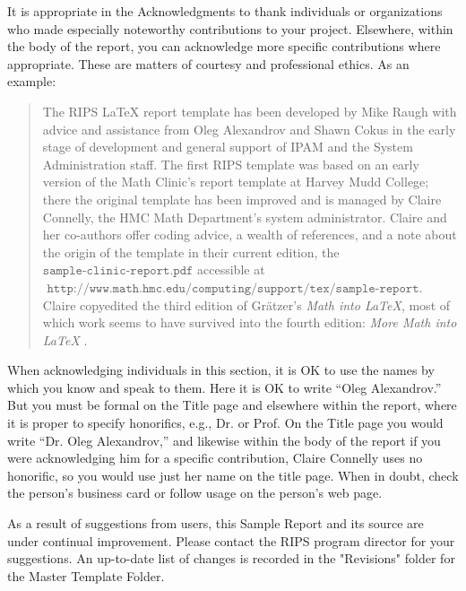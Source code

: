It is appropriate in the Acknowledgments to thank individuals or organizations who made especially noteworthy contributions to your project.
Elsewhere, within the body of the report, you can acknowledge more specific contributions where appropriate.
These are matters of courtesy and professional ethics.
As an example:

\begin{quote}
The RIPS {\LaTeX} report template has been developed by Mike Raugh with advice and assistance from Oleg 
Alexandrov and Shawn Cokus in the early stage of development and general support of IPAM and the System Administration staff.
The first RIPS template was based on an early version of the Math Clinic's report template at 
Harvey Mudd College;
there the original template has been improved and is managed by Claire Connelly, the HMC Math Department's system administrator.  
Claire and her co-authors offer coding advice, a wealth of references, and a note about the origin of the template in their current 
edition, the $\texttt{sample-clinic-report.pdf}$ accessible at $\texttt{ http://www.math.hmc.edu/computing/support/tex/sample-report}$.
Claire copyedited the third edition of Gr\"{a}tzer's \emph{Math into {LaTeX}}, most of which
work seems to have survived into the fourth edition:  \emph{More Math into {LaTeX}} \cite{gratzer}.
\end{quote}

When acknowledging individuals in this section, it is OK to use the names by which you know and speak to them.
Here it is OK to write ``Oleg Alexandrov.''
But you must be formal on the Title page and elsewhere within the report, where it is proper to specify honorifics, e.g., Dr. or Prof.
On the Title page you would write ``Dr. Oleg Alexandrov,''
and likewise within the body of the report if you were acknowledging him for a specific contribution, 
Claire Connelly uses no honorific, so you would use just her name on the title page.
When in doubt, check the person's business card or follow usage on the person's web page.

\vspace{8pt}
As a result of suggestions from users, this Sample Report and its source are under continual improvement.
Please contact the RIPS program director for your suggestions.
An up-to-date  list of changes is recorded in the "Revisions" folder for the Master Template Folder.

